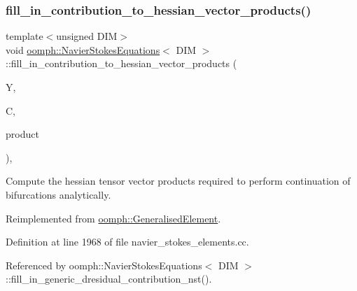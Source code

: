 \mbox{\label{classoomph_1_1NavierStokesEquations_a2bb1a43a7f60aafbfd2de233b539c3f0}} 
\subsubsection{\texorpdfstring{fill\+\_\+in\+\_\+contribution\+\_\+to\+\_\+hessian\+\_\+vector\+\_\+products()}{fill\_in\_contribution\_to\_hessian\_vector\_products()}}
{\footnotesize\ttfamily template$<$unsigned D\+IM$>$ \\
void \hyperlink{classoomph_1_1NavierStokesEquations}{oomph\+::\+Navier\+Stokes\+Equations}$<$ D\+IM $>$\+::fill\+\_\+in\+\_\+contribution\+\_\+to\+\_\+hessian\+\_\+vector\+\_\+products (\begin{DoxyParamCaption}\item[{\hyperlink{classoomph_1_1Vector}{Vector}$<$ double $>$ const \&}]{Y,  }\item[{\hyperlink{classoomph_1_1DenseMatrix}{Dense\+Matrix}$<$ double $>$ const \&}]{C,  }\item[{\hyperlink{classoomph_1_1DenseMatrix}{Dense\+Matrix}$<$ double $>$ \&}]{product }\end{DoxyParamCaption})\hspace{0.3cm}{\ttfamily [protected]}, {\ttfamily [virtual]}}



Compute the hessian tensor vector products required to perform continuation of bifurcations analytically. 



Reimplemented from \hyperlink{classoomph_1_1GeneralisedElement_a94e118d65f31ce404963509e462b2d0e}{oomph\+::\+Generalised\+Element}.



Definition at line 1968 of file navier\+\_\+stokes\+\_\+elements.\+cc.



Referenced by oomph\+::\+Navier\+Stokes\+Equations$<$ D\+I\+M $>$\+::fill\+\_\+in\+\_\+generic\+\_\+dresidual\+\_\+contribution\+\_\+nst().

